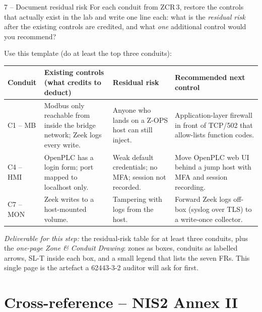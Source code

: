 \documentclass[11pt,a4paper]{article}
\begin{document}
\begin{stepbox}{7 -- Document residual risk}
For each conduit from ZCR\,3, restore the controls that actually exist in the lab and write one line each: what is the \emph{residual risk} after the existing controls are credited, and what \emph{one} additional control would you recommend?

Use this template (do at least the top three conduits):
\medskip

\noindent\small
\begin{tabular}{@{}p{} p{} p{} p{}@{}}
\toprule
\textbf{Conduit} & \textbf{Existing controls (what credits to deduct)} & \textbf{Residual risk} & \textbf{Recommended next control} \\
\midrule
C1 -- MB  & Modbus only reachable from inside the bridge network; Zeek logs every write. & Anyone who lands on a Z-OPS host can still inject. & Application-layer firewall in front of TCP/502 that allow-lists function codes. \\
C4 -- HMI & OpenPLC has a login form; port mapped to localhost only. & Weak default credentials; no MFA; session not recorded. & Move OpenPLC web UI behind a jump host with MFA and session recording. \\
C7 -- MON & Zeek writes to a host-mounted volume. & Tampering with logs from the host. & Forward Zeek logs off-box (syslog over TLS) to a write-once collector. \\
\bottomrule
\end{tabular}
\medskip

\emph{Deliverable for this step:} the residual-risk table for at least three conduits, plus the \emph{one-page Zone \& Conduit Drawing}: zones as boxes, conduits as labelled arrows, SL-T inside each box, and a small legend that lists the seven FRs. This single page is the artefact a 62443-3-2 auditor will ask for first.
\end{stepbox}

\section*{Cross-reference -- NIS2 Annex II}
\end{document}
